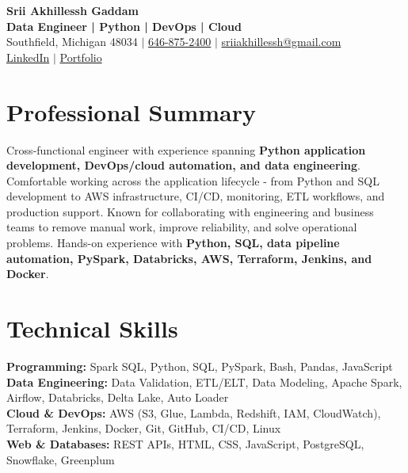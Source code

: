 \documentclass[letterpaper,10pt]{article}
\begin{document}
\fontsize{9.35pt}{10.45pt}\selectfont

\begin{center}
    {\LARGE \textbf{Srii Akhillessh Gaddam}} \\[-1pt]
    \textbf{Data Engineer | Python | DevOps | Cloud} \\[2pt]
    Southfield, Michigan 48034 $|$
    \href{tel:6468752400}{646-875-2400} $|$
    \href{mailto:sriiakhillessh@gmail.com}{sriiakhillessh@gmail.com} \\[1pt]
    \href{https://www.linkedin.com/in/srii-akhiilessh-gaddam-b48668191/}{LinkedIn} $|$
    \href{https://sriiakhillesshg.github.io/portfolio/}{Portfolio}
\end{center}
\vspace{-8pt}

\section{Professional Summary}
\small{Cross-functional engineer with experience spanning \textbf{Python application development, DevOps/cloud automation, and data engineering}. Comfortable working across the application lifecycle - from Python and SQL development to AWS infrastructure, CI/CD, monitoring, ETL workflows, and production support. Known for collaborating with engineering and business teams to remove manual work, improve reliability, and solve operational problems. Hands-on experience with \textbf{Python, SQL, data pipeline automation, PySpark, Databricks, AWS, Terraform, Jenkins, and Docker}.}

\section{Technical Skills}
\small{
\textbf{Programming:} Spark SQL, Python, SQL, PySpark, Bash, Pandas, JavaScript \\
\textbf{Data Engineering:} Data Validation, ETL/ELT, Data Modeling, Apache Spark, Airflow, Databricks, Delta Lake, Auto Loader \\
\textbf{Cloud \& DevOps:} AWS (S3, Glue, Lambda, Redshift, IAM, CloudWatch), Terraform, Jenkins, Docker, Git, GitHub, CI/CD, Linux \\
\textbf{Web \& Databases:} REST APIs, HTML, CSS, JavaScript, PostgreSQL, Snowflake, Greenplum
}

\end{document}
